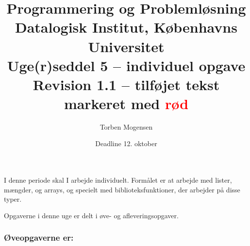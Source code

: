 \documentclass[a4paper]{article}
\begin{document}
\title{Programmering og Problemløsning\\
Datalogisk Institut, Københavns Universitet\\
Uge(r)seddel 5 -- individuel opgave\\
Revision 1.1 -- tilføjet tekst markeret med \textcolor{red}{rød}}

\author{Torben Mogensen}
\date{Deadline 12. oktober}

\maketitle

\noindent
I denne periode skal I arbejde individuelt.  Formålet er at arbejde
med lister, mængder, og arrays, og specielt med biblioteksfunktioner,
der arbejder på disse typer.

Opgaverne i denne uge er delt i øve- og afleveringsopgaver.

\subsubsection*{Øveopgaverne er:}
\end{document}

